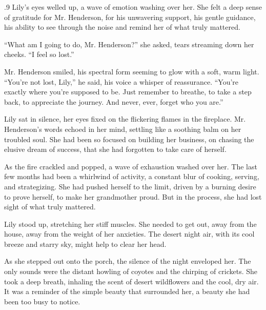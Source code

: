 \documentclass{article}
\newcommand{\Agentsroomzs}{\textsc{Agents' Room$_{ZS}$}}
\begin{document}
\begin{tcolorbox}[colback=white, colframe=gray!30!white, coltitle=black, parskip=5mm, title=
    \textbf{System output: \Agentsroomzs}, breakable]
\begin{spacing}{.9}
Lily’s eyes welled up, a wave of emotion washing over her.  She felt a deep sense of gratitude for Mr. Henderson, for his unwavering support, his gentle guidance, his ability to see through the noise and remind her of what truly mattered.\\\par

“What am I going to do, Mr. Henderson?” she asked, tears streaming down her cheeks.  “I feel so lost.”\\\par

Mr. Henderson smiled, his spectral form seeming to glow with a soft, warm light.  “You’re not lost, Lily,” he said, his voice a whisper of reassurance.  “You’re exactly where you’re supposed to be.  Just remember to breathe, to take a step back, to appreciate the journey.  And never, ever, forget who you are.”\\\par

Lily sat in silence, her eyes fixed on the flickering flames in the fireplace. Mr. Henderson’s words echoed in her mind, settling like a soothing balm on her troubled soul. She had been so focused on building her business, on chasing the elusive dream of success, that she had forgotten to take care of herself.\\\par

As the fire crackled and popped, a wave of exhaustion washed over her. The last few months had been a whirlwind of activity, a constant blur of cooking, serving, and strategizing. She had pushed herself to the limit, driven by a burning desire to prove herself, to make her grandmother proud. But in the process, she had lost sight of what truly mattered.\\\par

Lily stood up, stretching her stiff muscles. She needed to get out, away from the house, away from the weight of her anxieties. The desert night air, with its cool breeze and starry sky, might help to clear her head.\\\par

As she stepped out onto the porch, the silence of the night enveloped her. The only sounds were the distant howling of coyotes and the chirping of crickets. She took a deep breath, inhaling the scent of desert wildflowers and the cool, dry air. It was a reminder of the simple beauty that surrounded her, a beauty she had been too busy to notice.\\\par


\end{spacing}
\end{tcolorbox}
\end{document}
